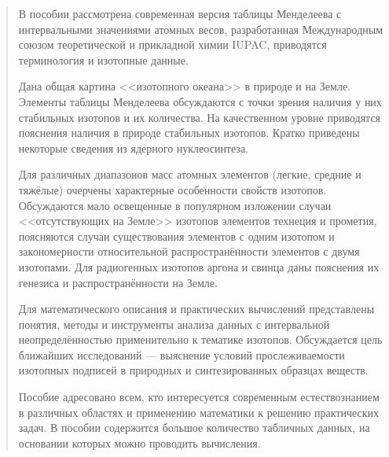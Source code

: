 \documentclass[a5paper,openany]{book}
\begin{document}
	\begin{quote}
		В пособии рассмотрена современная версия таблицы Менделеева с интервальными значениями атомных весов, разработанная Международным союзом теоретической и прикладной химии IUPAC, 
		приводятся терминология и изотопные данные.
		
		Дана общая картина <<изотопного океана>> в природе и на Земле. 
		Элементы таблицы Менделеева обсуждаются с точки зрения наличия у них стабильных изотопов и их количества.
		На качественном уровне приводятся пояснения наличия в природе стабильных изотопов. 
		Кратко приведены некоторые сведения из ядерного нуклеосинтеза.
		
		Для различных диапазонов масс атомных элементов (легкие, средние и тяжёлые) очерчены характерные особенности свойств изотопов.
		Обсуждаются мало освещенные в популярном изложении случаи <<отсутствующих на Земле>> изотопов элементов технеция и прометия,
		поясняются случаи существования элементов с одним изотопом и закономерности относительной распространённости элементов с двумя изотопами.
		Для радиогенных изотопов аргона и свинца даны пояснения их генезиса и распространённости на Земле.
		
		Для математического описания и практических вычислений представлены понятия, методы и инструменты анализа данных с интервальной неопределённостью применительно к тематике изотопов.
		Обсуждается цель ближайших исследований --- выяснение условий прослеживаемости изотопных подписей в природных и синтезированных образцах веществ.
		
		Пособие адресовано всем, кто интересуется современным естествознанием в различных областях и применению математики к решению практических задач. В пособии содержится большое количество табличных данных, на основании которых можно проводить вычисления.
	\end{quote}
	
	
	
	
	
	
	
	\tableofcontents      %
	
	\listoffigures
	
	\listoftables
	
\end{document}
